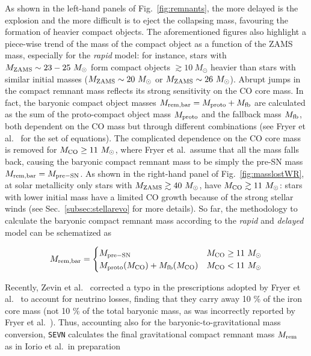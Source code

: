 \documentclass[a4paper,titlepage]{book}     	%
\newcommand{\sun}{\ensuremath{_\odot}}
\newcommand{\mzams}{M_\textup{ZAMS}}
\newcommand{\msun}{\ensuremath{M\sun}}
\begin{document}
As shown in the left-hand panels of Fig.\ \ref{fig:remnants}, the more delayed is the explosion and the more difficult is to eject the collapsing mass, favouring the formation of heavier compact objects. The aforementioned figures also highlight a piece-wise trend of the mass of the compact object as a function of the ZAMS mass, especially for the \emph{rapid} model: for instance, stars with $\mzams \sim 23-25~\msun$ form compact objects $\gtrsim 10~\msun$ heavier than stars with similar initial masses ($\mzams \sim 20~\msun$ or $\mzams \sim 26~\msun$). Abrupt jumps in the compact remnant mass reflects its strong sensitivity on the CO core mass. In fact, the baryonic compact object masses $M_{\rm rem, bar}=M_{\rm proto} + M_{\rm fb} $ are calculated as the sum of the proto-compact object mass $M_{\rm proto}$ and the fallback mass $M_{\rm fb}$, both dependent on the CO mass but through different combinations (see Fryer et al.\ \cite{Fryer2012} for the set of equations). The complicated dependence on the CO core mass is removed for $M_{\rm CO} \geq 11~\msun$, where Fryer et al.\ assume that all the mass falls back, causing the baryonic compact remnant mass to be simply the pre-SN mass $M_{\rm rem, bar} = M_{\rm pre-SN}$. As shown in the right-hand panel of Fig.\ \ref{fig:masslostWR}, at solar metallicity only stars with $\mzams \gtrsim 40~\msun$, have $M_{\rm CO} \gtrsim 11~\msun$: stars with lower initial mass have a limited CO growth because of the strong stellar winds (see Sec.\ \ref{subsec:stellarevo} for more details). So far, the methodology to calculate the baryonic compact remnant mass according to the \emph{rapid} and \emph{delayed} model can be schematized as 

\begin{equation}\label{eq:fryermass}
    M_{\rm rem, bar} = 
    \begin{cases}
    M_{\rm pre-SN} & M_{\rm CO} \geq 11~\msun \\
    M_{\rm proto}(M_{\rm CO}) + M_{\rm fb}(M_{\rm CO}) & M_{\rm CO} < 11~\msun 
    \end{cases}
\end{equation}

Recently, Zevin et al.\ \cite{Zevin2020_neutrinolosses} corrected a typo in the prescriptions adopted by Fryer et al.\ \cite{Fryer2012} to account for neutrino losses, finding that they carry away 10 \% of the iron core mass (not 10 \% of the total baryonic mass, as was incorrectly reported by Fryer et al.\ ). Thus, accounting also for the baryonic-to-gravitational mass conversion, \texttt{SEVN} calculates the final gravitational compact remnant mass $M_{\rm rem}$ as in Iorio et al.\ in preparation
\end{document}
